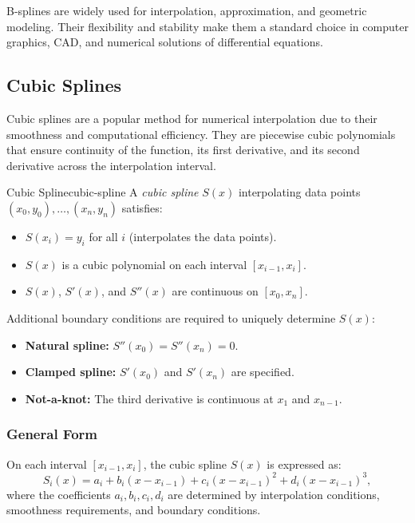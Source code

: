 B-splines are widely used for interpolation, approximation, and geometric modeling. Their flexibility and stability make them a standard choice in computer graphics, CAD, and numerical solutions of differential equations.

\subsection{Cubic Splines}
Cubic splines are a popular method for numerical interpolation due to their smoothness and computational efficiency. They are piecewise cubic polynomials that ensure continuity of the function, its first derivative, and its second derivative across the interpolation interval.

\begin{definition}{Cubic Spline}{cubic-spline}
    A \emph{cubic spline} \(S(x)\) interpolating data points \((x_0, y_0), \ldots, (x_n, y_n)\) satisfies:
    \begin{itemize}[nosep]
        \item \(S(x_i) = y_i\) for all \(i\) (interpolates the data points).
        \item \(S(x)\) is a cubic polynomial on each interval \([x_{i-1}, x_i]\).
        \item \(S(x)\), \(S'(x)\), and \(S''(x)\) are continuous on \([x_0, x_n]\).
    \end{itemize}
    Additional boundary conditions are required to uniquely determine \(S(x)\):
    \begin{itemize}[nosep]
        \item \textbf{Natural spline:} \(S''(x_0) = S''(x_n) = 0\).
        \item \textbf{Clamped spline:} \(S'(x_0)\) and \(S'(x_n)\) are specified.
        \item \textbf{Not-a-knot:} The third derivative is continuous at \(x_1\) and \(x_{n-1}\).
    \end{itemize}
\end{definition}

\subsubsection{General Form}
On each interval \([x_{i-1}, x_i]\), the cubic spline \(S(x)\) is expressed as:
\[
    S_i(x) = a_i + b_i (x - x_{i-1}) + c_i (x - x_{i-1})^2 + d_i (x - x_{i-1})^3,
\]
where the coefficients \(a_i, b_i, c_i, d_i\) are determined by interpolation conditions, smoothness requirements, and boundary conditions.

